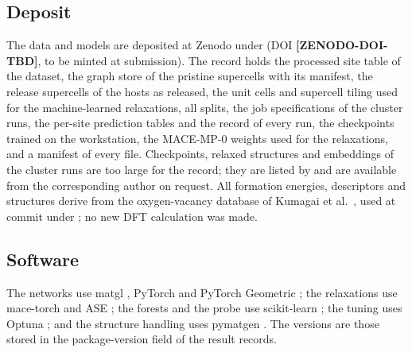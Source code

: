 \subsection{Deposit}

The data and models are deposited at Zenodo under \ccby{} (DOI \textbf{[ZENODO-DOI-TBD]}, to be minted at submission). The record holds the processed site table of the dataset, the graph store of the pristine supercells with its manifest, the release supercells of the hosts as released, the unit cells and supercell tiling used for the machine-learned relaxations, all splits, the job specifications of the cluster runs, the per-site prediction tables and the record of every run, the checkpoints trained on the workstation, the MACE-MP-0 weights used for the relaxations, and a \shatwo{} manifest of every file. Checkpoints, relaxed structures and embeddings of the cluster runs are too large for the record; they are listed by \shatwo{} and are available from the corresponding author on request. All formation energies, descriptors and structures derive from the oxygen-vacancy database of Kumagai et al.\ \citep{Kumagai2021insights}, used at commit \releasecommit{} under \ccby{}; no new DFT calculation was made.

\subsection{Software}

The networks use matgl \vermatgl{} \citep{Ko2025materials}, PyTorch \vertorch{} and PyTorch Geometric \verpyg{} \citep{Fey2019fast,Paszke2019pytorch}; the relaxations use mace-torch \vermace{} \citep{Batatia2025foundation} and ASE \verase{} \citep{HjorthLarsen2017atomic}; the forests and the probe use scikit-learn \versklearn{} \citep{Pedregosa2018scikitlearn}; the tuning uses Optuna \veroptuna{} \citep{Akiba2019optuna}; and the structure handling uses pymatgen \verpymatgen{} \citep{Ong2013python}. The versions are those stored in the package-version field of the result records.
